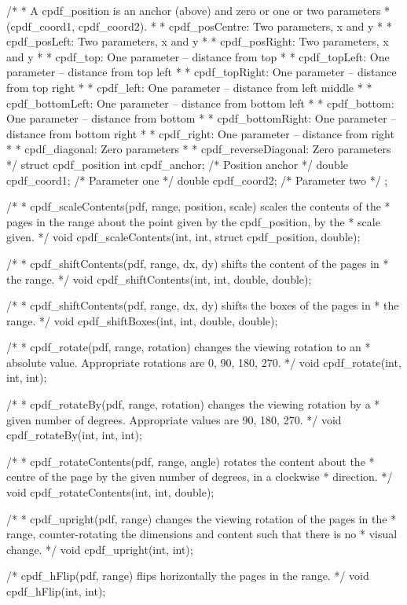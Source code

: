 /*
 * A cpdf_position is an anchor (above) and zero or one or two parameters
 * (cpdf_coord1, cpdf_coord2).
 *
 * cpdf_posCentre: Two parameters, x and y
 *
 * cpdf_posLeft: Two parameters, x and y
 *
 * cpdf_posRight: Two parameters, x and y
 *
 * cpdf_top: One parameter -- distance from top
 *
 * cpdf_topLeft: One parameter -- distance from top left
 *
 * cpdf_topRight: One parameter -- distance from top right
 *
 * cpdf_left: One parameter -- distance from left middle
 *
 * cpdf_bottomLeft: One parameter -- distance from bottom left
 *
 * cpdf_bottom: One parameter -- distance from bottom
 *
 * cpdf_bottomRight: One parameter -- distance from bottom right
 *
 * cpdf_right: One parameter -- distance from right
 *
 * cpdf_diagonal: Zero parameters
 *
 * cpdf_reverseDiagonal: Zero parameters
 */
struct cpdf_position {
  int cpdf_anchor;    /* Position anchor */
  double cpdf_coord1; /* Parameter one */
  double cpdf_coord2; /* Parameter two */
};

/*
 * cpdf_scaleContents(pdf, range, position, scale) scales the contents of the
 * pages in the range about the point given by the cpdf_position, by the
 * scale given.
 */
void cpdf_scaleContents(int, int, struct cpdf_position, double);

/*
 * cpdf_shiftContents(pdf, range, dx, dy) shifts the content of the pages in
 * the range.
 */
void cpdf_shiftContents(int, int, double, double);

/*
 * cpdf_shiftContents(pdf, range, dx, dy) shifts the boxes of the pages in
 * the range.
 */
void cpdf_shiftBoxes(int, int, double, double);

/*
 * cpdf_rotate(pdf, range, rotation) changes the viewing rotation to an
 * absolute value. Appropriate rotations are 0, 90, 180, 270.
 */
void cpdf_rotate(int, int, int);

/*
 * cpdf_rotateBy(pdf, range, rotation) changes the viewing rotation by a
 * given number of degrees. Appropriate values are 90, 180, 270.
 */
void cpdf_rotateBy(int, int, int);

/*
 * cpdf_rotateContents(pdf, range, angle) rotates the content about the
 * centre of the page by the given number of degrees, in a clockwise
 * direction.
 */
void cpdf_rotateContents(int, int, double);

/*
 * cpdf_upright(pdf, range) changes the viewing rotation of the pages in the
 * range, counter-rotating the dimensions and content such that there is no
 * visual change.
 */
void cpdf_upright(int, int);

/* cpdf_hFlip(pdf, range) flips horizontally the pages in the range. */
void cpdf_hFlip(int, int);

